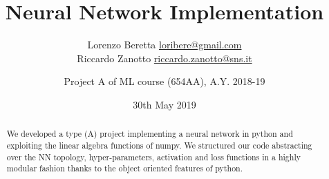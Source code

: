 \documentclass[12pt]{article}
\title{Neural Network Implementation}
\author{Lorenzo Beretta \href{mailto:loribere@gmail.com}{\url{loribere@gmail.com}}\\
  Riccardo Zanotto \href{mailto:riccardo.zanotto@sns.it}{\url{riccardo.zanotto@sns.it}}
  \and Project A of ML course (654AA), A.Y. 2018-19}
\date{30th May 2019}
\begin{document}
\maketitle

\begin{abstract}
  We developed a type (A) project implementing a neural network in python and exploiting the linear algebra functions of numpy. We structured our code abstracting over the NN topology, hyper-parameters, activation and loss functions in a highly modular fashion thanks to the object oriented features of python.  
\end{abstract}






\end{document}
